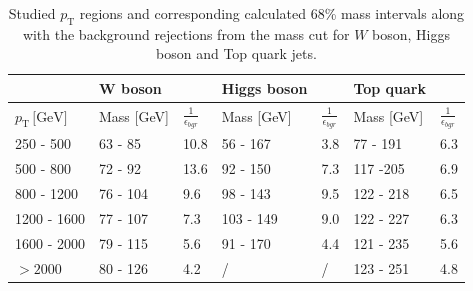 \begin{table}[]
\centering
\begin{tabular}{l||ll||ll||ll}
  &  \textbf{W boson}                                                    &                                 &  \textbf{Higgs boson}                                  &                                &    \textbf{Top quark}                                  &                                  \\ \hline
$p_{\mathrm{T}} \, \text{[GeV]}$   & \multicolumn{1}{l|}{Mass [GeV]} & $\frac{1}{\epsilon_{bgr}}$ & \multicolumn{1}{l|}{Mass [GeV]} & $\frac{1}{\epsilon_{bgr}}$ & \multicolumn{1}{l|}{Mass [GeV]}  & $\frac{1}{\epsilon_{bgr}}$ \\ \hline \hline
250 - 500 & \multicolumn{1}{l|}{63 - 85}                        & 10.8                            & \multicolumn{1}{l|}{56 - 167}          & 3.8                             & \multicolumn{1}{l|}{77 - 191}          & 6.3                             \\ \cline{1-7} 
500 - 800 & \multicolumn{1}{l|}{72 - 92}                        & 13.6                            & \multicolumn{1}{l|}{92 - 150}          & 7.3                             & \multicolumn{1}{l|}{117 -205}          & 6.9                             \\ \cline{1-7} 
800 - 1200 & \multicolumn{1}{l|}{76 - 104}                       & 9.6                             & \multicolumn{1}{l|}{98 - 143}          & 9.5                             & \multicolumn{1}{l|}{122 - 218}         & 6.5                             \\ \cline{1-7} 
1200 - 1600 & \multicolumn{1}{l|}{77 - 107}                       & 7.3                             & \multicolumn{1}{l|}{103 - 149}         & 9.0                             & \multicolumn{1}{l|}{122 - 227}         & 6.3                             \\ \cline{1-7} 
1600 - 2000 & \multicolumn{1}{l|}{79 - 115}                       & 5.6                             & \multicolumn{1}{l|}{91 - 170}          & 4.4                             & \multicolumn{1}{l|}{121 - 235}         & 5.6                             \\ \cline{1-7} 
$> 2000$ & \multicolumn{1}{l|}{80 - 126}                       & 4.2                             & \multicolumn{1}{l|}{/}                 & /                               & \multicolumn{1}{l|}{123 - 251}         & 4.8                             \\ \hline
\end{tabular}
\caption{\footnotesize{Studied $p_{\mathrm{T}}$ regions and corresponding calculated 68\% mass intervals along with the background rejections from the mass cut for $W$ boson, Higgs boson and Top quark jets.}} \label{table:mass_cut}
\end{table} 


